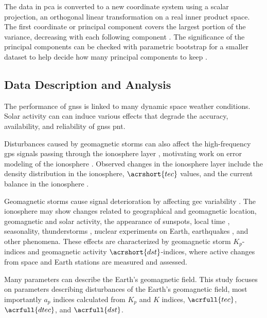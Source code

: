 \documentclass[sn-mathphys-num]{sn-jnl}%
\begin{document}
The data in \acrshort{pca} is converted to a new coordinate system using a scalar projection, an orthogonal linear transformation on a real inner product space. The first coordinate or principal component covers the largest portion of the variance, decreasing with each following component \cite{jolliffe2002principal, bengio2013representation}. The significance of the principal components can be checked with parametric bootstrap for a smaller dataset to help decide how many principal components to keep \cite{forkman2019hypothesis}.

\subsection{Data Description and Analysis}

The performance of \acrshort{gnss} is linked to many dynamic space weather conditions. Solar activity can \cite{tobiska1996current} can induce various effects that degrade the accuracy, availability, and reliability of \acrshort{gnss} \acrshort{pnt}.

Disturbances caused by geomagnetic storms \cite{vitinsky1986statistics} can also affect the high-frequency \acrshort{gps} signals \cite{lanyi1988comparison} passing through the ionosphere layer \cite{rishbeth1969introduction, ratcliffe1972introduction}, motivating work on error modeling of the ionosphere \cite{klobuchar1986design, zolesi2014ionospheric}. Observed changes in the ionosphere layer include the density distribution in the ionosphere, $\acrshort{tec}$ values, and the current balance in the ionosphere \cite{komjathy2023global}.

Geomagnetic storms \cite{NOAA2024aRadioCommunications} cause signal deterioration by affecting \acrfull{gec} variability \cite{Gray2019, Gray2021}. The ionosphere \cite{wild1994ionosphere} may show changes \cite{hawarey2010uzay} related to geographical and geomagnetic location, geomagnetic and solar activity, the appearance of sunspots, local time \cite{kotz2005encyclopedia}, seasonality, thunderstorms \cite{vellinov1992ionospheric}, nuclear experiments on Earth, earthquakes \cite{liu20142013}, and other phenomena. These effects are characterized by geomagnetic storm $K_{p}$-indices and geomagnetic activity $\acrshort{dst}$-indices, where active changes from space and Earth stations are measured and assessed.

Many parameters \cite{ulukavak2018analysis} can describe the Earth's geomagnetic field. This study focuses on parameters describing disturbances of the Earth's geomagnetic field, most importantly $a_{p}$ indices calculated from $K_{p}$ and $K$ indices, $\acrfull{tec}$, $\acrfull{dtec}$, and $\acrfull{dst}$. 
\end{document}
